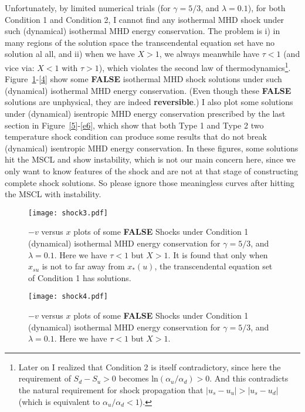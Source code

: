 \documentclass[fleqn,usenatbib]{mnras}
\begin{document}
Unfortunately, by limited numerical trials (for $\gamma=5/3$, and $\lambda=0.1$), for both Condition 1 and Condition 2, I cannot find any isothermal MHD shock under such (dynamical) isothermal MHD energy conservation. The problem is i) in  many regions of the solution space the transcendental equation set have no solution al all, and ii) when we have $X>1$, we always meanwhile have $\tau<1$ (and vice via: $X<1$ with $\tau>1$), which violates the second law of thermodynamics\footnote{Later on I realized that Condition 2 is itself contradictory, since here the requirement of $S_{d}-S_{u}>0$ becomes $\mathrm{ln}(\alpha_{u}/\alpha_{d})>0$. And this contradicts the natural requirement for shock propagation that $|u_{s}-u_{u}|>|u_{s}-u_{d}|$ (which is equivalent to $\alpha_{u}/\alpha_{d}<1$). }. Figure~\ref{1}-\ref{4} show some \textbf{FALSE} isothermal MHD shock solutions under such (dynamical) isothermal MHD energy conservation. (Even though these \textbf{FALSE} solutions are unphysical, they are indeed \textbf{reversible}.) I also plot some solutions under (dynamical) isentropic MHD energy conservation prescribed by the last section in Figure~\ref{5}-\ref{e6}, which show that both Type 1 and Type 2 two temperature shock condition can produce some results that do not break (dynamical) isentropic MHD energy conservation. In these figures, some solutions hit the MSCL and show instability, which is not our main concern here, since we only want to know features of the shock and are not at that stage of constructing complete shock solutions. So please ignore those meaningless curves after hitting the MSCL with instability.

\begin{figure}
\centering
\texttt{[image: shock3.pdf]}
\caption{$-v$ versus $x$ plots of some \textbf{FALSE} Shocks under Condition 1 (dynamical) isothermal MHD energy conservation for $\gamma=5/3$, and $\lambda=0.1$. Here we have $\tau<1$ but $X>1$. It is found that only when $x_{su}$ is not to far away from $x_{*}(u)$, the transcendental equation set of Condition 1 has solutions.}
\label{1}
\end{figure}

\begin{figure}
\centering
\texttt{[image: shock4.pdf]}
\caption{$-v$ versus $x$ plots of some \textbf{FALSE} Shocks under Condition 1 (dynamical) isothermal MHD energy conservation for $\gamma=5/3$, and $\lambda=0.1$. Here we have $\tau<1$ but $X>1$.}
\label{2}
\end{figure}
\end{document}
